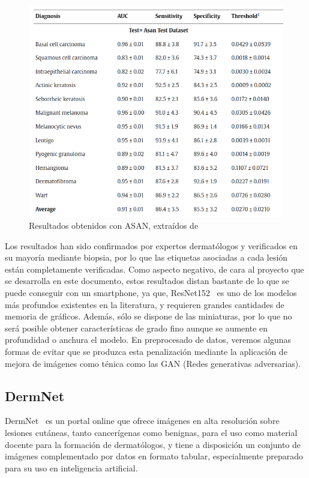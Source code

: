 \begin{figure}[H]
	\centering
	\includegraphics[scale = 0.45]{imagenes/results_asan.png}
	\caption{Resultados obtenidos con ASAN, extraídos de \cite{HAN20189}}
	\label{fig:resultadosasan}
\end{figure}

Los resultados han sido confirmados por expertos dermatólogos y verificados en su mayoría mediante biopsia, por lo que las etiquetas asociadas a cada lesión están completamente verificadas. Como aspecto negativo, de cara al proyecto que se desarrolla en este documento, estos resultados distan bastante de lo que se puede conseguir con un smartphone, ya que, ResNet152~\cite{he2015deep} es uno de los modelos más profundos existentes en la literatura, y requieren grandes cantidades de memoria de gráficos. Además, sólo se dispone de las miniaturas, por lo que no será posible obtener características de grado fino aunque se aumente en profundidad o anchura el modelo. En preprocesado de datos, veremos algunas formas de evitar que se produzca esta penalización mediante la aplicación de mejora de imágenes como ténica como las GAN (Redes generativas adversarias)\cite{goodfellow2014generative}.

\subsection{DermNet}

DermNet~\cite{dermnetz} es un portal online que ofrece imágenes en alta resolución sobre lesiones cutáneas, tanto cancerígenas como benignas, para el uso como material docente para la formación de dermatólogos, y tiene a disposición un conjunto de imágenes complementado por datos en formato tabular, especialmente preparado para su uso en inteligencia artificial.

